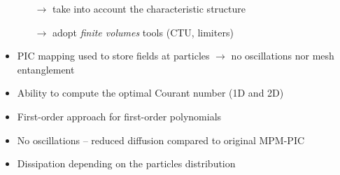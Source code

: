 \documentclass[11pt,aspectratio=169]{beamer}
\newcommand{\footnoteCite}[1]{
  {\tiny 
  \begin{flushleft}
    \foreach \x in {#1}{\cite{\x}  \fullcite{\x}\\}
  \end{flushleft}
}
}
\begin{document}
\begin{frame}[standout]{}
\begin{scriptsize}
\begin{overprint}
\begin{block}{\footnotesize {}}
\begin{itemize}
\begin{itemize}
          \item[$\rightarrow$] \scriptsize take into account the characteristic structure 
          \item[$\rightarrow$] \scriptsize adopt \textit{finite volumes} tools (CTU, limiters) 
          \end{itemize}
        \item PIC mapping used to store fields at particles $\rightarrow$ no oscillations nor mesh entanglement
        \end{itemize}
      \end{block}
      \vspace{-0.3cm}
      \begin{block}{\footnotesize {}}
      \vskip -6pt
        \begin{itemize}
        \item Ability to compute the optimal Courant number (1D and 2D) \cite{DGMPM_stab}
        \item First-order approach for first-order polynomials
        \end{itemize}
      \end{block}
      \vspace{-0.3cm}
      \begin{block}{\footnotesize {}}
      \vskip -6pt
        \begin{itemize}
        \item No oscillations -- reduced diffusion compared to original MPM-PIC
        \item Dissipation depending on the particles distribution
        \end{itemize}
      \end{block}
    \end{overprint}
    
  \end{scriptsize}
  
\end{frame}
\end{document}
